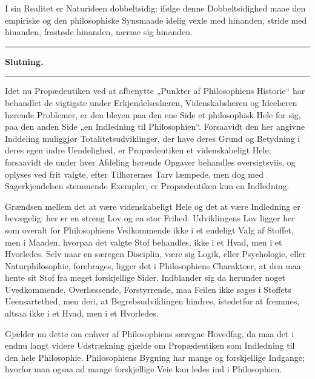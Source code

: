 \documentclass[12pt]{book}
\newcommand{\opage}[1]{\marginnote{\footnotesize\textit{[#1]}}}
\begin{document}
I sin Realitet er Naturideen dobbeltsidig: ifølge denne Dobbeltsidighed maae den empiriske og den
philosophiske Synsmaade idelig vexle med hinanden, stride med hinanden, frastøde hinanden, nærme sig
hinanden.

\begin{center}\rule{0.35\linewidth}{0.4pt}\end{center}
\opage{199} \begin{center}
  {\Large\bfseries Slutning.}\par\vspace{4pt}
  \rule{2.5cm}{0.4pt}
\end{center}
{}

Idet nu Propædeutiken ved at afbenytte „Punkter af Philosophiens Historie“ har behandlet de vigtigste
under Erkjendelseslæren, Videnskabslæren og Ideelæren hørende Problemer, er den bleven paa den ene
Side et philosophisk Hele for sig, paa den anden Side „en Indledning til Philosophien“. Forsaavidt
den her angivne Inddeling muliggjør Totalitetsudviklinger, der have deres Grund og Betydning i deres
egen indre Uendelighed, er Propædeutiken et videnskabeligt Hele; forsaavidt de under hver Afdeling
hørende Opgaver behandles oversigtsviis, og oplyses ved frit valgte, efter Tilhørernes Tarv læmpede,
men dog med Sagerkjendelsen stemmende Exempler, er Propædeutiken kun en Indledning.

Grændsen mellem det at være videnskabeligt Hele og det at være Indledning er bevægelig: her er en
streng Lov og en stor Frihed. Udviklingens Lov ligger her som overalt for Philosophiens Vedkommende
ikke i et endeligt Valg af Stoffet, men i Maaden, hvorpaa det valgte Stof behandles, ikke i et Hvad,
men i et Hvorledes. Selv naar en særegen Disciplin, være sig Logik, eller Psychologie, eller
Naturphilosophie, forebrages, ligger det i Philosophiens Charakteer, at den maa hente sit Stof fra
meget forskjellige Sider. Indblander sig da herunder noget Uvedkommende, Overlæssende, Forstyrrende,
maa Feilen ikke søges i Stoffets Ueensartethed, men deri, at Begrebsudviklingen hindres,
\opage{200} istedetfor at fremmes, altsaa ikke i et Hvad, men i et Hvorledes.

Gjælder nu dette om enhver af Philosophiens særegne Hovedfag, da maa det i endnu langt videre
Udstrækning gjælde om Propædeutiken som Indledning til den hele Philosophie. Philosophiens Bygning har
mange og forskjellige Indgange; hvorfor man ogsaa ad mange forskjellige Veie kan ledes ind i
Philosophien.
\end{document}
